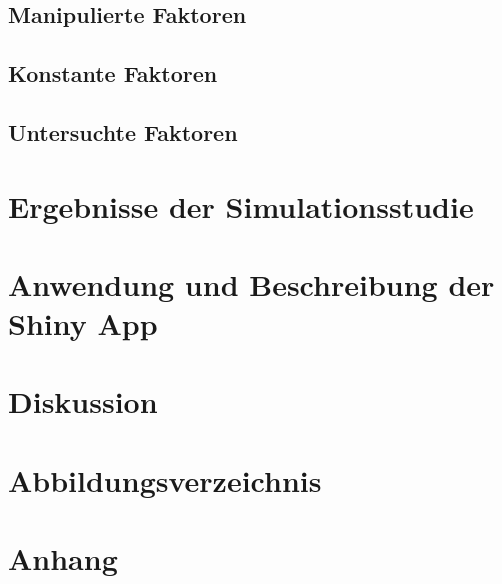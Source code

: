 \documentclass[12pt]{article}\usepackage[]{graphicx}\usepackage[]{color}
\begin{document}
\subsection{Manipulierte Faktoren}
\subsection{Konstante Faktoren}
\subsection{Untersuchte Faktoren}

\section{Ergebnisse der Simulationsstudie}
\section{Anwendung und Beschreibung der Shiny App}
\section{Diskussion}
\newpage



\section{Abbildungsverzeichnis}
\section{Anhang}
\end{document}
